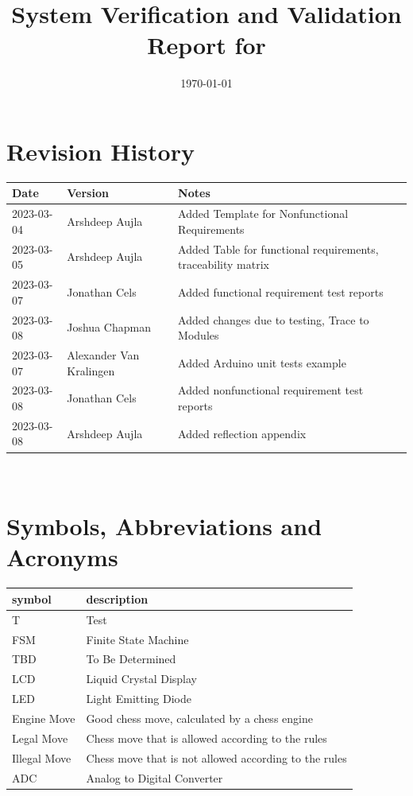 \documentclass[12pt, titlepage]{article}
\begin{document}
\title{System Verification and Validation Report for \progname{}} 
\author{\authname}
\date{\today}
	
\maketitle


\section{Revision History}

\begin{tabularx}{\textwidth}{p{3cm}p{2cm}X}
\toprule {\bf Date} & {\bf Version} & {\bf Notes}\\
\midrule
2023-03-04 & Arshdeep Aujla & Added Template for Nonfunctional Requirements\\
2023-03-05 & Arshdeep Aujla & Added Table for functional requirements, traceability matrix\\
2023-03-07 & Jonathan Cels & Added functional requirement test reports\\
2023-03-08 & Joshua Chapman & Added changes due to testing, Trace to Modules\\
2023-03-07 & Alexander Van Kralingen & Added Arduino unit tests example\\
2023-03-08 & Jonathan Cels & Added nonfunctional requirement test reports\\
2023-03-08 & Arshdeep Aujla & Added reflection appendix\\
\bottomrule
\end{tabularx}

~\newpage

\section{Symbols, Abbreviations and Acronyms}

\renewcommand{\arraystretch}{1.2}
\begin{tabular}{l l} 
    \toprule		
    \textbf{symbol} & \textbf{description}\\
    \midrule 
    T & Test\\
  FSM & Finite State Machine\\
    TBD & To Be Determined\\
    LCD & Liquid Crystal Display\\
    LED & Light Emitting Diode\\
    Engine Move & Good chess move, calculated by a chess engine\\
    Legal Move & Chess move that is allowed according to the rules\\
    Illegal Move & Chess move that is not allowed according to the rules\\
    ADC & Analog to Digital Converter\\
  \bottomrule
\end{tabular}\\
\end{document}
